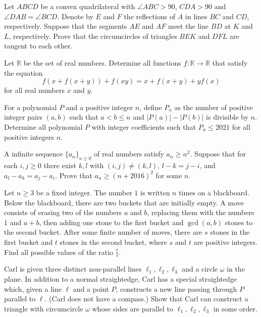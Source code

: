 \documentclass[11pt]{scrartcl}
\begin{document}
\begin{problem}[728988632553727]
Let $ABCD$ be a convex quadrilateral with $\angle ABC>90$, $CDA>90$ and $\angle DAB=\angle BCD$. Denote by $E$ and $F$ the reflections of $A$ in lines $BC$ and $CD$, respectively. Suppose that the segments $AE$ and $AF$ meet the line $BD$ at $K$ and $L$, respectively. Prove that the circumcircles of triangles $BEK$ and $DFL$ are tangent to each other.
\end{problem}
\begin{problem}[380257662603408]
	Let $\mathbb R$ be the set of real numbers. Determine all functions $f:\mathbb R\to\mathbb R$ that satisfy the equation\[f(x+f(x+y))+f(xy)=x+f(x+y)+yf(x)\]for all real numbers $x$ and $y$.
\end{problem}
\begin{problem}[2988718857225198152]
	For a polynomial $P$ and a positive integer $n$, define $P_n$ as the number of positive integer pairs $(a,b)$ such that $a<b \leq n$ and $|P(a)|-|P(b)|$ is divisible by $n$. Determine all polynomial $P$ with integer coefficients such that $P_n \leq 2021$ for all positive integers $n$.
\end{problem}
\begin{problem}[748293992911976]
	A infinite sequence $\{ a_n \}_{n \ge 0}$ of real numbers satisfy $a_n \ge n^2$. Suppose that for each $i, j \ge 0$ there exist $k, l$ with $(i,j) \neq (k,l)$, $l - k = j - i$, and $a_l - a_k = a_j - a_i$. Prove that $a_n \ge (n + 2016)^2$ for some $n$.
\end{problem}
\begin{problem}[1743818063911276331]
Let $n \geq 3$ be a fixed integer. The number $1$ is written $n$ times on a blackboard. Below the blackboard, there are two buckets that are initially empty. A move consists of erasing two of the numbers $a$ and $b$, replacing them with the numbers $1$ and $a+b$, then adding one stone to the first bucket and $\gcd(a, b)$ stones to the second bucket. After some finite number of moves, there are $s$ stones in the first bucket and $t$ stones in the second bucket, where $s$ and $t$ are positive integers. Find all possible values of the ratio $\frac{t}{s}$.
\end{problem}
\begin{problem}[6306108494297192985]
Carl is given three distinct non-parallel lines $\ell_1, \ell_2, \ell_3$ and a circle $\omega$ in the plane. In addition to a normal straightedge, Carl has a special straightedge which, given a line $\ell$ and a point $P$, constructs a new line passing through $P$ parallel to $\ell$. (Carl does not have a compass.) Show that Carl can construct a triangle with circumcircle $\omega$ whose sides are parallel to $\ell_1,\ell_2,\ell_3$ in some order.
\end{problem}
\end{document}
